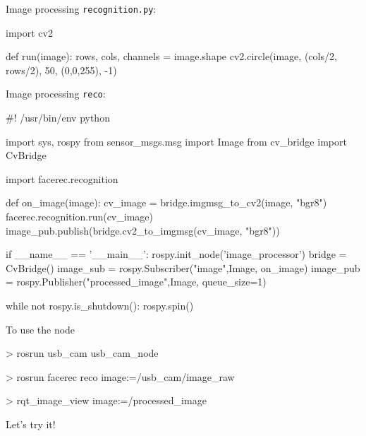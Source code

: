 \documentclass[compress]{beamer}
\begin{document}
{\begin{frame}[fragile]{Image processing}
\texttt{recognition.py}:
\begin{pythoncode}
import cv2

def run(image):
    rows, cols, channels = image.shape
    cv2.circle(image, (cols/2, rows/2), 50, (0,0,255), -1)
\end{pythoncode}
\end{frame}

\begin{frame}[fragile]{Image processing}
\texttt{reco}:
\begin{pythoncode}
#! /usr/bin/env python

import sys, rospy
from sensor_msgs.msg import Image
from cv_bridge import CvBridge

import facerec.recognition

def on_image(image):
    cv_image = bridge.imgmsg_to_cv2(image, "bgr8")
    facerec.recognition.run(cv_image)
    image_pub.publish(bridge.cv2_to_imgmsg(cv_image, "bgr8"))

if __name__ == '__main__':
    rospy.init_node('image_processor')
    bridge = CvBridge()
    image_sub = rospy.Subscriber("image",Image, on_image)
    image_pub = rospy.Publisher("processed_image",Image, queue_size=1)

    while not rospy.is_shutdown():
        rospy.spin()
\end{pythoncode}

\end{frame}

\begin{frame}[fragile]{To use the node}


\begin{shcode}
> rosrun usb_cam usb_cam_node
\end{shcode}


\begin{shcode}
> rosrun facerec reco image:=/usb_cam/image_raw
\end{shcode}


\begin{shcode}
> rqt_image_view image:=/processed_image
\end{shcode}

\end{frame}


\begin{frame}[plain]
    \begin{center}
        \Large
    Let's try it!
    \end{center}
\end{frame}


}
\end{document}
